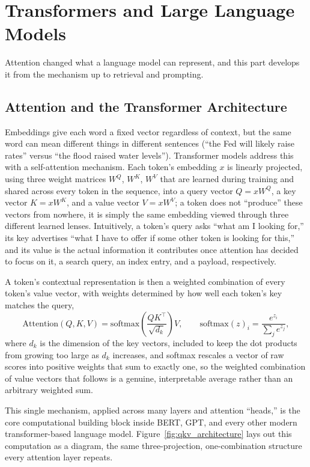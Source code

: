 \documentclass[../ai_in_finance]{subfiles}
\begin{document}
\section{Transformers and Large Language Models}

Attention changed what a language model can represent, and this part develops it from the mechanism up to retrieval and prompting.

\subsection{Attention and the Transformer Architecture}
\label{sec:attention-transformers}

Embeddings give each word a fixed vector regardless of context, but the same word can mean different things in different sentences (``the Fed will likely raise rates'' versus ``the flood raised water levels''). Transformer models address this with a self-attention mechanism. Each token's embedding $x$ is linearly projected, using three weight matrices $W^Q$, $W^K$, $W^V$ that are learned during training and shared across every token in the sequence, into a query vector $Q=xW^Q$, a key vector $K=xW^K$, and a value vector $V=xW^V$; a token does not ``produce'' these vectors from nowhere, it is simply the same embedding viewed through three different learned lenses. Intuitively, a token's query asks ``what am I looking for,'' its key advertises ``what I have to offer if some other token is looking for this,'' and its value is the actual information it contributes once attention has decided to focus on it, a search query, an index entry, and a payload, respectively.

A token's contextual representation is then a weighted combination of every token's value vector, with weights determined by how well each token's key matches the query,
\begin{equation*}
\text{Attention}(Q,K,V) = \text{softmax}\!\left(\frac{QK^\top}{\sqrt{d_k}}\right) V, \qquad \text{softmax}(z)_i = \frac{e^{z_i}}{\sum_j e^{z_j}},
\end{equation*}
where $d_k$ is the dimension of the key vectors, included to keep the dot products from growing too large as $d_k$ increases, and softmax rescales a vector of raw scores into positive weights that sum to exactly one, so the weighted combination of value vectors that follows is a genuine, interpretable average rather than an arbitrary weighted sum.

This single mechanism, applied across many layers and attention ``heads,'' is the core computational building block inside BERT, GPT, and every other modern transformer-based language model. Figure~\ref{fig:qkv_architecture} lays out this computation as a diagram, the same three-projection, one-combination structure every attention layer repeats.
\end{document}
